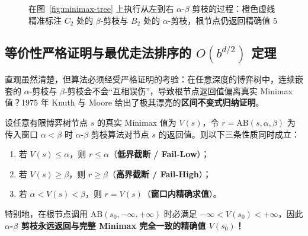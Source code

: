 \begin{figure}[htbp]
{}
\caption{在图~\ref{fig:minimax-tree} 上执行从左到右 $\alpha$-$\beta$ 剪枝的过程：橙色虚线精准标注 $C_2$ 处的 $\beta$-剪枝与 $B_2$ 处的 $\alpha$-剪枝，根节点仍返回精确值 $5$}\label{fig:ab-tree}
\end{figure}

\subsection{等价性严格证明与最优走法排序的 $O(b^{d/2})$ 定理}

直观虽然清楚，但算法必须经受严格证明的考验：在任意深度的博弈树中，连续嵌套的 $\alpha$-剪枝与 $\beta$-剪枝会不会“互相误伤”，导致根节点返回值偏离真实 Minimax 值？1975 年 Knuth 与 Moore 给出了极其漂亮的\textbf{区间不变式归纳证明}。

\begin{thmBox}
\begin{theorem}\label{thm:ab-equiv}
设任意有限博弈树节点 $s$ 的真实 Minimax 值为 $V(s)$，令 $r = \mathrm{AB}(s, \alpha, \beta)$ 为传入窗口 $\alpha < \beta$ 时 $\alpha$-$\beta$ 剪枝算法对节点 $s$ 的返回值。则以下三条性质同时成立：
\begin{enumerate}
  \item 若 $V(s) \le \alpha$，则 $r \le \alpha$（\textbf{低界截断 / Fail-Low}）；
  \item 若 $V(s) \ge \beta$，则 $r \ge \beta$（\textbf{高界截断 / Fail-High}）；
  \item 若 $\alpha < V(s) < \beta$，则 $r = V(s)$（\textbf{窗口内精确求值}）。
\end{enumerate}
特别地，在根节点调用 $\mathrm{AB}(s_0, -\infty, +\infty)$ 时必满足 $-\infty < V(s_0) < +\infty$，因此\textbf{$\alpha$-$\beta$ 剪枝永远返回与完整 Minimax 完全一致的精确值 $V(s_0)$！}
\end{theorem}
\end{thmBox}


